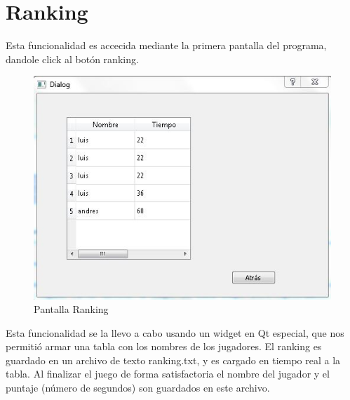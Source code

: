 \section{Ranking}
Esta funcionalidad es accecida mediante la primera pantalla del programa, dandole click al botón ranking.
\begin{figure}[htbp]
\begin{center}
\includegraphics[width=.60\textwidth]{./imagenes/5.jpg}
\caption{Pantalla Ranking}
\label{Pantalla Ranking}
\end{center}
\end{figure}
Esta funcionalidad se la llevo a cabo usando un widget en Qt especial, que nos permitió armar una tabla con los nombres de los jugadores. El ranking es guardado en un archivo de texto ranking.txt, y es cargado en tiempo real a la tabla. Al finalizar el juego de forma satisfactoria el nombre del jugador y el puntaje (número de segundos) son guardados en este archivo.


